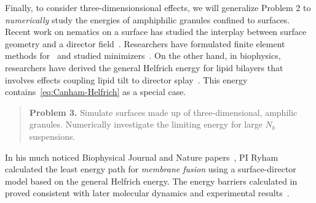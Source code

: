 Finally, to consider three-dimensionsional effects, we will generalize
Problem 2 to \emph{numerically} study the energies of amphiphilic
granules confined to surfaces. Recent work on nematics on a surface has
studied the interplay between surface geometry and a director
field~\cite{Nestler2020PropertiesOS, Nitschke2018NematicLC,
Nestler2018OrientationalOO, Nitschke2019HydrodynamicII,
Nitschke2020LiquidCO}. Researchers have formulated finite element
methods for~\cite{Bartels2012FiniteEM, Nochetto2015NumericsFL,
Nestler2019AFE} and studied minimizers~\cite{Segatti2014EquilibriumCO,
Segatti2014AnalysisOA}. On the other hand, in biophysics, researchers
have derived the general Helfrich energy for lipid bilayers that
involves effects coupling lipid tilt to director
splay~\cite{Hamm2000ElasticEO, Terzi2019CurvatureTiltTO, Terzi2019ACQ,
Terzi2017NovelTC, Pinigin2020NewCT}. This energy
contains~\eqref{eq:Canham-Helfrich} as a special case.
\begin{quotation}
  \noindent
  \textbf{Problem 3.} Simulate surfaces made up of three-dimensional,
  amphilic granules. Numerically investigate the limiting energy for
  large $N_b$ suspensions.
\end{quotation}
In his much noticed Biophysical Journal and Nature
papers~\cite{RyKlYaCo16, Chetal16}, PI Ryham calculated the least energy
path for \emph{membrane fusion} using a surface-director model based on
the general Helfrich energy. The energy barriers calculated
in~\cite{RyKlYaCo16} proved consistent with later molecular dynamics and
experimental results~\cite{SmRiMu19, 2017PNAS..114.1238F}.

